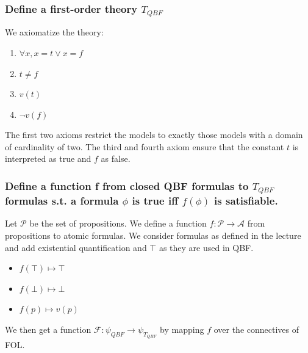 \subsubsection{Define a first-order theory $T_{QBF}$}
We axiomatize the theory:
\begin{enumerate}
  \item $\forall x, x = t \lor x = f$
  \item $t \neq f$
  \item $v(t)$
  \item $\neg v(f)$
\end{enumerate}

The first two axioms restrict the models to exactly those models with a domain of cardinality of two. The third and fourth axiom ensure that the constant $t$ is interpreted as true and $f$ as false.

\subsubsection{Define a function f from closed QBF formulas to $T_{QBF}$ formulas s.t. a formula $\phi$ is true iff $f(\phi)$ is satisfiable.}

Let $\mathcal{P}$ be the set of propositions. We define a function $f : \mathcal{P} \to \mathcal{A}$ from propositions to atomic formulas.
We consider formulas as defined in the lecture and add existential quantification and $\top$ as they are used in QBF.
\begin{itemize}
  \item $f(\top) \mapsto \top$
  \item $f(\bot) \mapsto \bot$
  \item $f(p) \mapsto v(p)$
\end{itemize}
We then get a function $\mathcal{F}: \psi_{QBF} \to \psi_{T_{QBF}}$ by mapping $f$ over the connectives of FOL.

